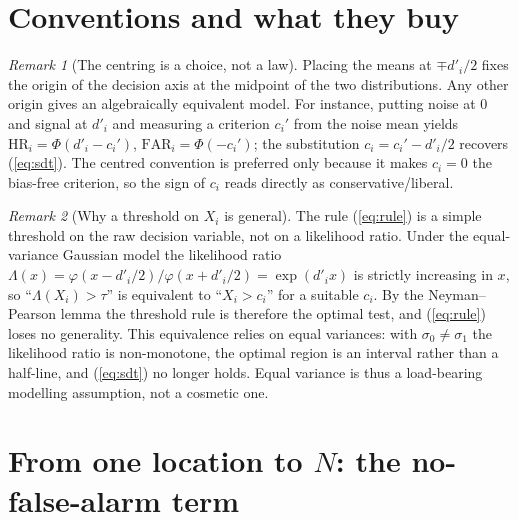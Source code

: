 \documentclass[11pt]{article}
\theoremstyle{remark}
\newtheorem{remark}{Remark}
\newcommand{\HR}{\mathrm{HR}}
\newcommand{\FAR}{\mathrm{FAR}}
\newcommand{\dprime}{d'}
\newcommand{\Nloc}{N}
\begin{document}
\section{Conventions and what they buy}
\label{sec:conventions}

\begin{remark}[The centring is a choice, not a law]
Placing the means at $\mp\dprime_i/2$ fixes the origin of the decision
axis at the midpoint of the two distributions. Any other origin gives
an algebraically equivalent model. For instance, putting noise at $0$
and signal at $\dprime_i$ and measuring a criterion $c_i'$ from the
noise mean yields $\HR_i = \Phi(\dprime_i - c_i')$,
$\FAR_i = \Phi(-c_i')$; the substitution $c_i = c_i' - \dprime_i/2$
recovers (\ref{eq:sdt}). The centred convention is preferred only
because it makes $c_i = 0$ the bias-free criterion, so the sign of
$c_i$ reads directly as conservative/liberal.
\end{remark}

\begin{remark}[Why a threshold on $X_i$ is general]
The rule (\ref{eq:rule}) is a simple threshold on the raw decision
variable, not on a likelihood ratio. Under the equal-variance Gaussian
model the likelihood ratio
$\Lambda(x) = \varphi(x - \dprime_i/2)/\varphi(x + \dprime_i/2)
= \exp(\dprime_i x)$ is strictly increasing in $x$, so
``$\Lambda(X_i) > \tau$'' is equivalent to ``$X_i > c_i$'' for a
suitable $c_i$. By the Neyman--Pearson lemma the threshold rule is
therefore the optimal test, and (\ref{eq:rule}) loses no generality.
This equivalence relies on equal variances: with $\sigma_0 \ne
\sigma_1$ the likelihood ratio is non-monotone, the optimal region is
an interval rather than a half-line, and (\ref{eq:sdt}) no longer
holds. Equal variance is thus a load-bearing modelling assumption, not
a cosmetic one.
\end{remark}

\section{From one location to \texorpdfstring{$\Nloc$}{N}: the no-false-alarm term}
\label{sec:pnofa}
\end{document}
